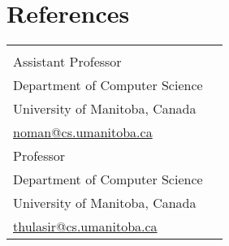 \documentclass[letterpaper,11pt]{article}
\begin{document}
\section{References}
        \begin{tabularx}{\textwidth}{XX}
            \begin{tabular}[c]{@{}l@{}}
                \textbf{Dr. Noman Mohammed}\\ 
                \small{Assistant Professor}\\
                \small{Department of Computer Science}\\
                \small{University of Manitoba, Canada}\\ 
                \small{\href{mailto:noman@cs.umanitoba.ca}{noman@cs.umanitoba.ca}}
            \end{tabular} 
            & 
            \begin{tabular}[c]{@{}l@{}}
                \textbf{Dr. Parimala Thulasiraman}\\
                \small{Professor}\\
                \small{Department of Computer Science}\\
                \small{University of Manitoba, Canada}\\
                \small{\href{mailto:thulasir@cs.umanitoba.ca}{thulasir@cs.umanitoba.ca}}
            \end{tabular}
        \end{tabularx}
\end{document}
